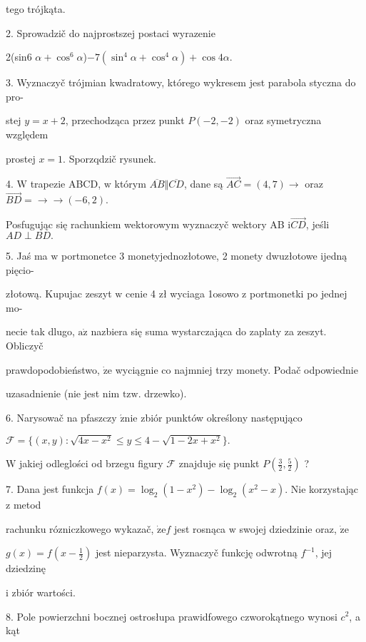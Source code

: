 \documentclass[a4paper,12pt]{article}
\begin{document}
tego trójkąta.

2. Sprowadzič do najprostszej postaci wyrazenie

2(sin6 $\alpha+\cos^{6}\alpha$)$-7(\sin^{4}\alpha+\cos^{4}\alpha)+\cos 4\alpha.$

3. Wyznaczyč trójmian kwadratowy, którego wykresem jest parabola styczna do pro-

stej $y=x+2$, przechodząca przez punkt $P(-2,-2)$ oraz symetryczna względem

prostej $x=1$. Sporzqdzič rysunek.

4. $\mathrm{W}$ trapezie ABCD, $\mathrm{w}$ którym $\overline{AB}\Vert\overline{CD}$, dane są $\vec{AC}=(4,7)\rightarrow$ oraz $\vec{BD}=\rightarrow\rightarrow(-6,2).$

Posfugując się rachunkiem wektorowym wyznaczyč wektory AB $\mathrm{i}\vec{CD}$, jeśli $AD\perp BD.$

5. Jaś ma $\mathrm{w}$ portmonetce 3 monetyjednozłotowe, 2 monety dwuzłotowe ijedną pięcio-

złotową. Kupujac zeszyt $\mathrm{w}$ cenie 4 zł wyciaga 1osowo $\mathrm{z}$ portmonetki po jednej mo-

necie tak dlugo, $\mathrm{a}\dot{\mathrm{z}}$ nazbiera się suma wystarczająca do zaplaty za zeszyt. Obliczyč

prawdopodobieństwo, $\dot{\mathrm{z}}\mathrm{e}$ wyciągnie co najmniej trzy monety. Podač odpowiednie

uzasadnienie (nie jest nim $\mathrm{t}\mathrm{z}\mathrm{w}$. drzewko).

6. Narysowač na pfaszczy $\acute{\mathrm{z}}\mathrm{n}\mathrm{i}\mathrm{e}$ zbiór punktów określony następująco

$\mathcal{F}=\{(x,y):\sqrt{4x-x^{2}}\leq y\leq 4-\sqrt{1-2x+x^{2}}\}.$

$\mathrm{W}$ jakiej odleglości od brzegu figury $\mathcal{F}$ znajduje się punkt $P(\displaystyle \frac{3}{2},\frac{5}{2})$ ?

7. Dana jest funkcja $f(x) = \log_{2}(1-x^{2})-\log_{2}(x^{2}-x)$. Nie korzystając $\mathrm{z}$ metod

rachunku rózniczkowego wykazač, $\dot{\mathrm{z}}\mathrm{e}f$ jest rosnąca $\mathrm{w}$ swojej dziedzinie oraz, $\dot{\mathrm{z}}\mathrm{e}$

$g(x)=f(x-\displaystyle \frac{1}{2})$ jest nieparzysta. Wyznaczyč funkcję odwrotną $f^{-1}$, jej dziedzinę

$\mathrm{i}$ zbiór wartości.

8. Pole powierzchni bocznej ostrosłupa prawidfowego czworokątnego wynosi $c^{2}$, a kąt
\end{document}
